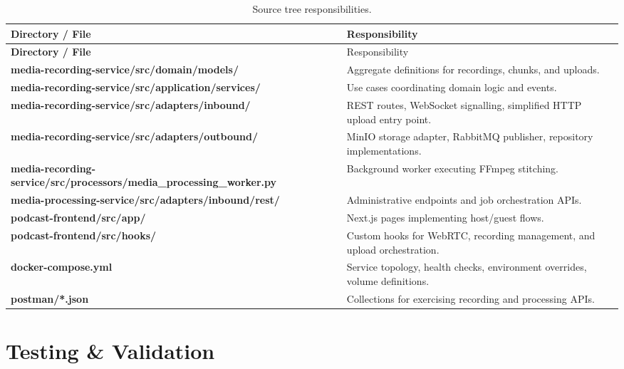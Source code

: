 \documentclass[12pt]{article}
\begin{document}
\begin{longtable}{>{\bfseries}p{4.0cm}p{10cm}}
\caption{Source tree responsibilities.}
\label{tab:code}\\
\toprule
Directory / File & Responsibility \\
\midrule
\endfirsthead
\toprule
Directory / File & Responsibility \\
\midrule
\endhead
\bottomrule
\endfoot
media-recording-service/src/domain/models/ & Aggregate definitions for recordings, chunks, and uploads. \\
media-recording-service/src/application/services/ & Use cases coordinating domain logic and events. \\
media-recording-service/src/adapters/inbound/ & REST routes, WebSocket signalling, simplified HTTP upload entry point. \\
media-recording-service/src/adapters/outbound/ & MinIO storage adapter, RabbitMQ publisher, repository implementations. \\
media-recording-service/src/processors/media\_processing\_worker.py & Background worker executing FFmpeg stitching. \\
media-processing-service/src/adapters/inbound/rest/ & Administrative endpoints and job orchestration APIs. \\
podcast-frontend/src/app/ & Next.js pages implementing host/guest flows. \\
podcast-frontend/src/hooks/ & Custom hooks for WebRTC, recording management, and upload orchestration. \\
docker-compose.yml & Service topology, health checks, environment overrides, volume definitions. \\
postman/*.json & Collections for exercising recording and processing APIs. \\
\end{longtable}

\section{Testing \& Validation}
\end{document}
